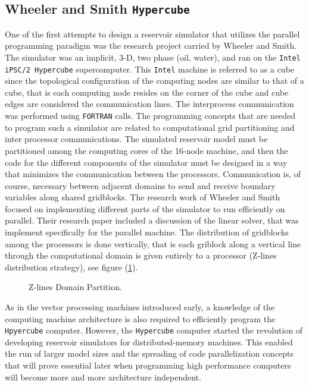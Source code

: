 \documentclass[barcolor=BrickRed,nocopyright,nolists]{asmejour}
\begin{document}
\subsection{Wheeler and Smith \texttt{Hypercube}}
One of the first attempts to design a reservoir simulator that utilizes the parallel programming paradigm was the research project carried by Wheeler and Smith\cite{spe19804}.
The simulator was an implicit, 3-D, two phase (oil, water), and ran on the \texttt{Intel iPSC/2 Hypercube} supercomputer. This \texttt{Intel} machine is referred to as a cube since 
the topological configuration of the computing nodes are similar to that of a cube, that is each computing node resides on the corner of the cube and cube edges are considered the 
communication lines. The interprocess communication was performed using \texttt{FORTRAN} calls. The programming concepts that are needed to program such
a simulator are related to computational grid partitioning and inter processor communications. The simulated reservoir model must be partitioned among the computing cores
of the 16-node machine, and then the code for the different components of the simulator must be designed in a way that minimizes the communication between the processors.
Communication is, of course, necessary between adjacent domains to send and receive boundary variables along shared gridblocks.
The research work of Wheeler and Smith focused on implementing different parts of the simulator to run efficiently on parallel. Their research paper included a discussion of
the linear solver, that was implement specifically for the parallel machine. The distribution of gridblocks among the processors is done vertically, that is each griblock along a vertical line
through the computational domain is given entirely to a processor (Z-lines distribution strategy), see figure (\ref{cube}).

\begin{figure}[h]
	\centering\scalebox{0.5}{}
	\caption{Z-lines Domain Partition.}
	\label{cube}
\end{figure}
As in the vector processing machines introduced early, a knowledge of the computing machine architecture is also required to efficiently program the \texttt{Hpyercube} computer\cite{duchark}.
However, the \texttt{Hypercube} computer started the revolution of developing reservoir simulators for distributed-memory machines. This enabled the run of larger model sizes and the spreading
of code parallelization concepts that will prove essential later when programming high performance computers will become more and more architecture independent.
\end{document}
